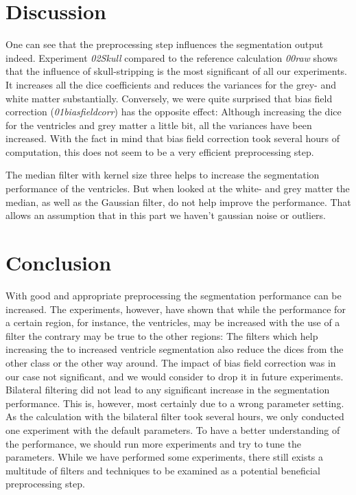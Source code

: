 \documentclass[journal]{IEEEtran}
\begin{document}
\section{Discussion}
One can see that the preprocessing step influences the segmentation output indeed.
Experiment \textit{02Skull} compared to the reference calculation \textit{00raw} shows that the influence of skull-stripping is the most significant of all our experiments. It increases all the dice coefficients and reduces the variances for the grey- and white matter substantially. Conversely, we were quite surprised that bias field correction (\textit{01biasfieldcorr}) has the opposite effect: Although increasing the dice for the ventricles and grey matter a little bit, all the variances have been increased. With the fact in mind that bias field correction took several hours of computation, this does not seem to be a very efficient preprocessing step.

The median filter with kernel size three helps to increase the segmentation performance of the ventricles. But when looked at the white- and grey matter the median, as well as the Gaussian filter, do not help improve the performance. That allows an assumption that in this part we haven't gaussian noise or outliers.

\section{Conclusion}
With good and appropriate preprocessing the segmentation performance can be increased. The experiments, however, have shown that while the performance for a certain region, for instance, the ventricles, may be increased with the use of a filter the contrary may be true to the other regions: The filters which help increasing the to increased ventricle segmentation also reduce the dices from the other class or the other way around. The impact of bias field correction was in our case not significant, and we would consider to drop it in future experiments. Bilateral filtering did not lead to any significant increase in the segmentation performance. This is, however, most certainly due to a wrong parameter setting. As the calculation with the bilateral filter took several hours, we only conducted one experiment with the default parameters. To have a better understanding of the performance, we should run more experiments and try to tune the parameters. While we have performed some experiments, there still exists a multitude of filters and techniques to be examined as a potential beneficial preprocessing step.
\end{document}
